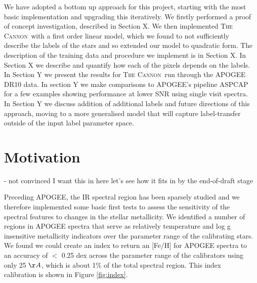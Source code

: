 \documentclass[12pt, preprint]{aastex}
\newcommand{\tc}{\textsc{The Cannon}}
\begin{document}
We have adopted a bottom up approach for this project, starting with the most basic implementation and upgrading this iteratively. We firstly performed a proof of concept investigation, described in Section X. We then implemented \tc\ with a first order linear model, which we found to not  sufficiently describe the labels of the stars and so extended our model to quadratic form. The description of the training data and procedure we implement is in Section X. In Section X we describe and quantify how each of the pixels depends on the labels. In Section Y we present the results for \tc\ run through the APOGEE DR10 data. In section Y we make comparisons to APOGEE's pipeline ASPCAP for a few examples showing performance at lower SNR using single visit spectra. In Section Y we discuss addition of additional labels and future directions of this approach, moving to a more generalised model that will capture label-transfer outside of the input label parameter space. 



\section{Motivation}

- not convinced I want this in here let's see how it fits in by the end-of-draft stage

Preceding APOGEE, the IR spectral region has been sparsely studied and we therefore implemented some basic first tests to assess the sensitivity of the spectral features to changes in the stellar metallicity.  We identified a number of regions in APOGEE spectra that serve as relatively temperature and log g insensitive metallicity indicators over the parameter range of the calibrating stars. We found we could create an index to return an [Fe/H] for APOGEE spectra to an accuracy of $<$ 0.25 dex across the parameter range of the calibrators using only 25 $\AA$, which is about 1\% of the total spectral region. This index calibration is shown in Figure \ref{fig:index}.
\end{document}
